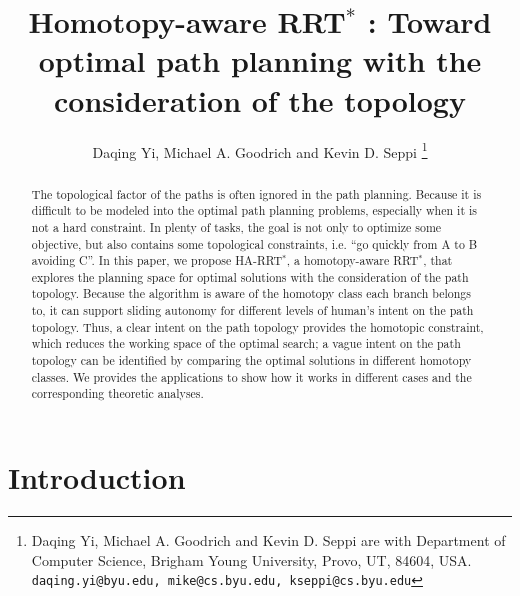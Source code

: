 \documentclass[letterpaper, 10 pt, conference]{ieeeconf}
\title{\LARGE \bf
Homotopy-aware RRT$^{*}$ : Toward optimal path planning with the consideration of the topology
}
\author{
Daqing Yi, Michael A. Goodrich and Kevin D. Seppi
\thanks{Daqing Yi, Michael A. Goodrich and Kevin D. Seppi are with Department of Computer Science, Brigham Young University, Provo, UT, 84604, USA.
{\tt\small daqing.yi@byu.edu, mike@cs.byu.edu, kseppi@cs.byu.edu} }
}
\begin{document}
\maketitle
\thispagestyle{empty}
\pagestyle{empty}


\begin{abstract}
The topological factor of the paths is often ignored in the path planning.
Because it is difficult to be modeled into the optimal path planning problems, especially when it is not a hard constraint.
In plenty of tasks, the goal is not only to optimize some objective, but also contains some topological constraints, i.e. ``go quickly from A to B avoiding C''.
In this paper, we propose HA-RRT$^{*}$, a homotopy-aware RRT$^{*}$, that explores the planning space for optimal solutions with the consideration of the path topology.
Because the algorithm is aware of the homotopy class each branch belongs to, it can support sliding autonomy for different levels of human's intent on the path topology.
Thus, a clear intent on the path topology provides the homotopic constraint, which reduces the working space of the optimal search;
a vague intent on the path topology can be identified by comparing the optimal solutions in different homotopy classes.
We provides the applications to show how it works in different cases and the corresponding theoretic analyses.
\end{abstract}

\section{Introduction}
\label{sec:intro}
\end{document}
